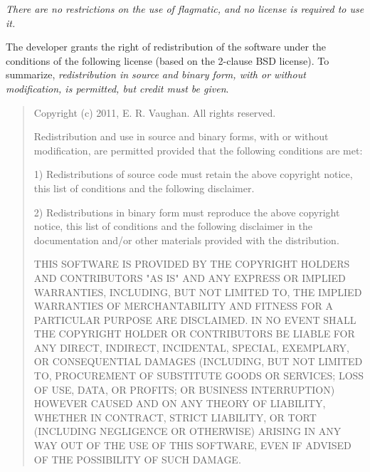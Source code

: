 \documentclass{article}
\begin{document}
\emph{There are no restrictions on the use of flagmatic, and no license is required to use it.}

The developer grants the right of redistribution of the software under the conditions of the following license (based on the 2-clause BSD license). To summarize, \emph{redistribution in source and binary form, with or without modification, is permitted, but credit must be given}.

\begin{quote}
Copyright (c) 2011, E. R. Vaughan. All rights reserved.

Redistribution and use in source and binary forms, with or without modification,
are permitted provided that the following conditions are met:

1) Redistributions of source code must retain the above copyright notice, this
list of conditions and the following disclaimer.

2) Redistributions in binary form must reproduce the above copyright notice,
this list of conditions and the following disclaimer in the documentation and/or
other materials provided with the distribution.

THIS SOFTWARE IS PROVIDED BY THE COPYRIGHT HOLDERS AND CONTRIBUTORS "AS IS" AND
ANY EXPRESS OR IMPLIED WARRANTIES, INCLUDING, BUT NOT LIMITED TO, THE IMPLIED
WARRANTIES OF MERCHANTABILITY AND FITNESS FOR A PARTICULAR PURPOSE ARE
DISCLAIMED. IN NO EVENT SHALL THE COPYRIGHT HOLDER OR CONTRIBUTORS BE LIABLE FOR
ANY DIRECT, INDIRECT, INCIDENTAL, SPECIAL, EXEMPLARY, OR CONSEQUENTIAL DAMAGES
(INCLUDING, BUT NOT LIMITED TO, PROCUREMENT OF SUBSTITUTE GOODS OR SERVICES;
LOSS OF USE, DATA, OR PROFITS; OR BUSINESS INTERRUPTION) HOWEVER CAUSED AND ON
ANY THEORY OF LIABILITY, WHETHER IN CONTRACT, STRICT LIABILITY, OR TORT
(INCLUDING NEGLIGENCE OR OTHERWISE) ARISING IN ANY WAY OUT OF THE USE OF THIS
SOFTWARE, EVEN IF ADVISED OF THE POSSIBILITY OF SUCH DAMAGE.
\end{quote}

\newpage
\end{document}
